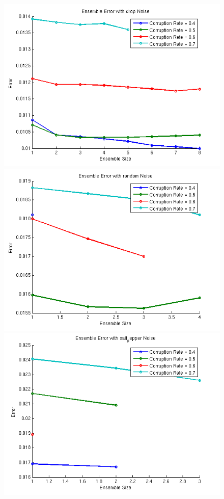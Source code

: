 \documentclass{article} %
\begin{document}
\begin{figure}[]
\centering
\begin{minipage}{.75\textwidth}
  \vspace*{\fill}
  \centering
  \includegraphics[width=.85\textwidth]{ensemble_drop}
  \label{fig:ecr_drop}
  \includegraphics[width=.85\textwidth]{ensemble_rand}
  \label{fig:ecr_rand}
  \includegraphics[width=.85\textwidth]{ensemble_sp}

\end{minipage}
\end{figure}
\end{document}
